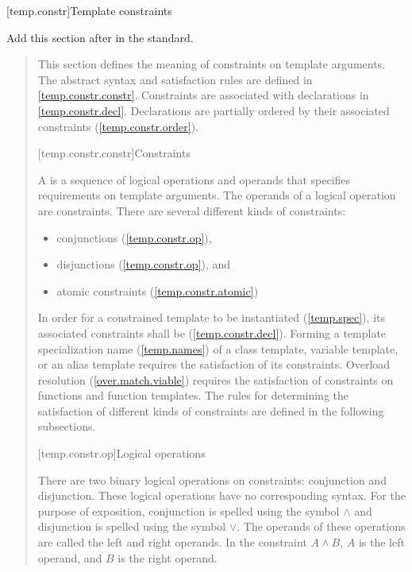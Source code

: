 
\setcounter{section}{9}
[temp.constr]{Template constraints}

Add this section after  in the \Cpp standard.

\begin{quote}
\begin{addedblock}

\pnum
\enternote
This section defines the meaning of constraints on template arguments.
% 
The abstract syntax and satisfaction rules are defined
in \ref{temp.constr.constr}. 
% 
Constraints are associated with declarations in \ref{temp.constr.decl}.
% 
Declarations are partially ordered by their associated constraints 
(\ref{temp.constr.order}).
\exitnote


[temp.constr.constr]{Constraints}

\pnum
A  is a sequence of logical operations and 
operands that specifies requirements on template arguments.
The operands of a logical operation are constraints.
% 
There are several different kinds of constraints:
\begin{itemize}
\item conjunctions (\ref{temp.constr.op}),
\item disjunctions (\ref{temp.constr.op}), and
\item atomic constraints (\ref{temp.constr.atomic})
\end{itemize}

\pnum
In order for a constrained template to be instantiated (\ref{temp.spec}), its 
associated constraints shall be  (\ref{temp.constr.decl}).
% 
\enternote
Forming a template specialization name (\ref{temp.names}) of a class template, 
variable template, or an alias template requires the satisfaction of its 
constraints.
Overload resolution (\ref{over.match.viable}) requires the satisfaction of
constraints on functions and function templates.
\exitnote
% 
The rules for determining the satisfaction of different kinds of 
constraints are defined in the following subsections.


[temp.constr.op]{Logical operations}

\pnum
There are two binary logical operations on constraints: conjunction
and disjunction.
% 
\enternote 
These logical operations have no corresponding \Cpp syntax.
For the purpose of exposition, conjunction is spelled
using the symbol $\land$ and disjunction is spelled using the 
symbol $\lor$. 
% 
The operands of these operations are called the left 
and right operands. In the constraint $A \land B$,
$A$ is the left operand, and $B$ is the right operand.
\exitnote


\end{addedblock}
\end{quote}
